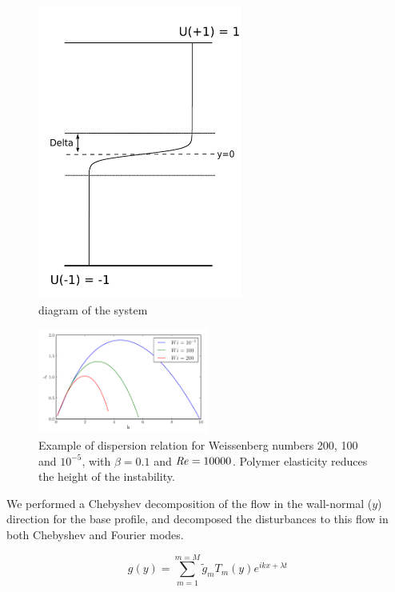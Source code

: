 \documentclass{jfm}
\newcommand\Rey{\mbox{\textit{Re}}}  %
\begin{document}
\begin{figure}
    \centering
    \includegraphics[width=0.6\textwidth]{KH_diagram}
    \caption{diagram of the system}
    \label{fig:diagram}
\end{figure}

\begin{figure}
    \centering
    \includegraphics[width=0.5\textwidth]{KH_dispersion}
    \caption{Example of dispersion relation for Weissenberg numbers 200, 100 and $10^{-5}$, with $\beta = 0.1$ and $\Rey = 10000$. Polymer elasticity reduces the height of the instability.}
    \label{fig:KH_growth_rate}
\end{figure}

We performed a Chebyshev decomposition of the flow in the wall-normal ($y$) direction for the base profile, and decomposed the disturbances to this flow in both Chebyshev and Fourier modes.

\begin{equation}
    g(y) = \sum\limits_{m=1}^{m=M} \widetilde{g}_{m} T_{m}(y) e^{ikx + \lambda t}
\end{equation}
\end{document}
